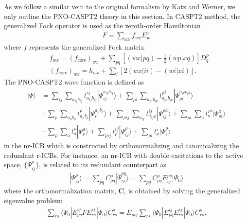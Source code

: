 \documentclass[aip,jcp,amsmath]{revtex4-1}
\begin{document}
%
As we follow a similar vein to the original formalism by Katz and Werner,\cite{:/content/aip/journal/jcp/145/12/10.1063/1.4963019,doi:10.1063/1.5097644} we only outline the PNO-CASPT2 theory in this section.
%
In CASPT2 method, the generalized Fock operator is used as the zeroth-order Hamiltonian
%
\begin{align}
  F=\sum_{wx} f_{wx} E^x_w
\end{align}
%
where $f$ represents the generalized Fock matrix
%
\begin{align}
  &f_{wx} = (f_\text{core})_{wx} + \sum_{pq} \left[(wx|pq)-\frac{1}{2}(wp|xq)\right]D^p_q \\
  &(f_\text{core})_{wx} = h_{wx} + \sum_{i} [2(wx|ii)-(wi|xi)]. 
\end{align}
%
The PNO-CASPT2 wave function is defined as
%
\begin{align}
  |\Psi\rangle&=\sum_{ij}\sum_{a_{ij}b_{ij}} t_{a_{ij}b_{ij}}^{ij}|\Psi_{ij}^{a_{ij}b_{ij}}\rangle+\sum_{\rho i}\sum_{a_{\rho i}b_{\rho i}} t_{a_{\rho i}b_{\rho i}}^{\rho i}|\Psi_{{\rho i}}^{a_{\rho i}b_{\rho i}}\rangle \nonumber \\
  &+\sum_{\rho}\sum_{a_{\rho}b_{\rho}} t_{a_{\rho}b_{\rho}}^{\rho}|\Psi_{{\rho}}^{a_{\rho}b_{\rho}}\rangle + \sum_{\rho ij}\sum_{a_{ij}} t_{a_{ij}\rho}^{ij}|\Psi_{ij}^{\rho a}\rangle +\sum_{\rho i}\sum_a t_{a}^{\rho i}|\Psi_{\rho i}^{a}\rangle \nonumber \\
  &+\sum_{\rho}\sum_a t_{a}^\rho|\Psi_\rho^a\rangle + \sum_{\rho ij} t_{\rho}^{ij}|\Psi_{ij}^\rho\rangle+\sum_{\rho i} t_{\rho}^i|\Psi_{i}^\rho\rangle \label{eq:pno-caspt2}
\end{align}
%
in the nr-ICB which is constructed by orthonormalizing and canonicalizing the redundant r-ICBs.
%
For instance, an nr-ICB with double excitations to the active space, $\{\Psi^{\rho}_{ij}\}$, is related to its redundant counterpart as
%
\begin{align}
  |\Psi_{ij}^{\rho}\rangle=\sum_{pq} C_{pq}^{\rho} |\tilde{\Psi}_{ij}^{pq}\rangle = \sum_{pq} C_{pq}^{\rho} E_{ij}^{pq} |\Psi_0\rangle
\end{align}
%
where the orthonormalization matrix, $\mathbf{C}$, is obtained by solving the generalized eigenvalue problem:
%
\begin{align}
  \sum_{rs}\langle\Psi_0|E_{pq}^{ij}FE_{rs}^{ij}|\Psi_0\rangle C_{rs}^\rho=E_{\rho ij}\sum_{rs}\langle\Psi_0|E_{pq}^{ij}E_{rs}^{ij}|\Psi_0\rangle C_{rs}^\rho. \label{eq:eigen-Vp2}
\end{align}
\end{document}
